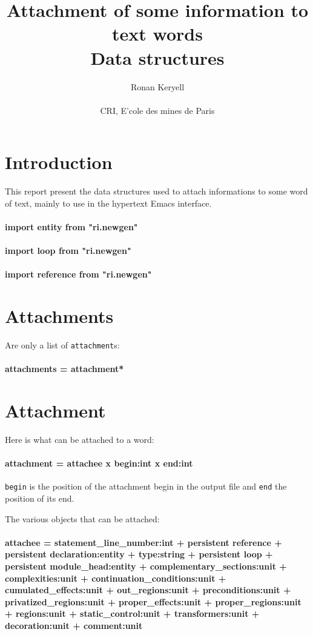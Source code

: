 

\title{Attachment of some information to text words\\Data structures}
\author{Ronan Keryell\\
                \\
        CRI, E'cole des mines de Paris}

\newcommand{\domain}[1]{\paragraph{{#1}}}



\section*{Introduction}

This report present the data structures used to attach
informations to some word of text, mainly to use in the hypertext Emacs
interface.

\domain{import entity from "ri.newgen"}
\domain{import loop from "ri.newgen"}
\domain{import reference from "ri.newgen"}

\section{Attachments}

Are only a list of {\tt attachment}s:

\domain{attachments = attachment*}


\section{Attachment}

Here is what can be attached to a word:

\domain{attachment = attachee x begin:int x end:int}

{\tt begin} is the position of the attachment begin in the output
file and {\tt end} the position of its end.

The various objects that can be attached:
\domain{attachee = statement\_line\_number:int + persistent reference + persistent declaration:entity + type:string + persistent loop + persistent module\_head:entity + complementary\_sections:unit + complexities:unit + continuation\_conditions:unit + cumulated\_effects:unit + out\_regions:unit + preconditions:unit + privatized\_regions:unit + proper\_effects:unit + proper\_regions:unit + regions:unit + static\_control:unit + transformers:unit + decoration:unit + comment:unit}

